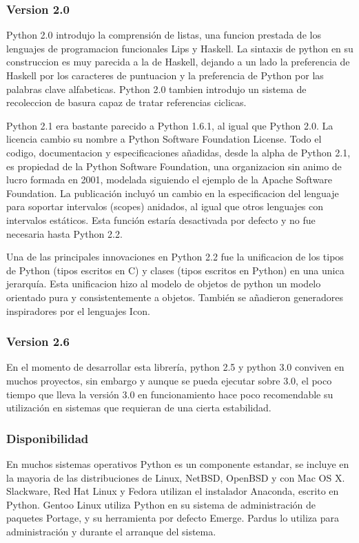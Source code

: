 \documentclass[a4paper,spanish,12pt]{book}
\begin{document}
\subsubsection{Version 2.0}

Python 2.0 introdujo la comprensión de listas, una funcion prestada de los lenguajes de programacion funcionales Lips y Haskell. La sintaxis de python en su construccion es muy parecida a la de Haskell, dejando a un lado la preferencia de Haskell por los caracteres de puntuacion y la preferencia de Python por las palabras clave alfabeticas. Python 2.0 tambien introdujo un sistema de recoleccion de basura capaz de tratar referencias ciclicas.

Python 2.1 era bastante parecido a Python 1.6.1, al igual que Python 2.0. La licencia cambio su nombre a Python Software Foundation License. Todo el codigo, documentacion y especificaciones añadidas, desde la alpha de Python 2.1, es propiedad de la Python Software Foundation, una organizacion sin animo de lucro formada en 2001, modelada siguiendo el ejemplo de la Apache Software Foundation. La publicación incluyó un cambio en la especificacion del lenguaje para soportar intervalos (scopes) anidados, al igual que otros lenguajes con intervalos estáticos. Esta función estaría desactivada por defecto y no fue necesaria hasta Python 2.2.

Una de las principales innovaciones en Python 2.2 fue la unificacion de los tipos de Python (tipos escritos en C) y clases (tipos escritos en Python) en una unica jerarquía. Esta unificacion hizo al modelo de objetos de python un modelo orientado pura y consistentemente a objetos. Tambi\'en se añadieron generadores inspiradores por el lenguajes Icon.

\subsubsection{Version 2.6}

En el momento de desarrollar esta librería, python 2.5 y python 3.0 conviven en muchos proyectos, sin embargo y aunque se pueda ejecutar sobre 3.0, el poco tiempo que lleva la versión 3.0 en funcionamiento hace poco recomendable su utilización en sistemas que requieran de una cierta estabilidad.

\subsubsection{Disponibilidad}

En muchos sistemas operativos Python es un componente estandar, se incluye en la mayoria de las distribuciones de Linux, NetBSD, OpenBSD y con Mac OS X. Slackware, Red Hat Linux y Fedora utilizan el instalador Anaconda, escrito en Python. Gentoo Linux utiliza Python en su sistema de administración de paquetes Portage, y su herramienta por defecto Emerge. Pardus lo utiliza para administración y durante el arranque del sistema.
\end{document}
